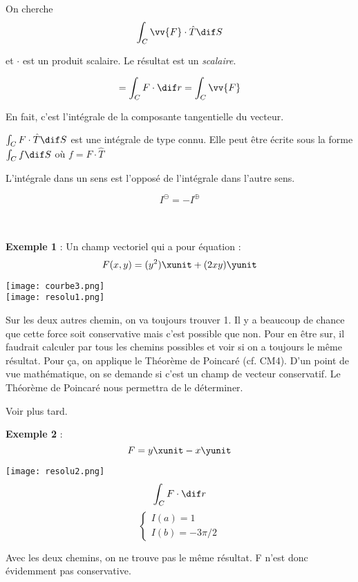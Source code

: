 On cherche
\[\int_C\vv{F}\cdot \hat T \dif S\]

et $\cdot$ est un produit scalaire. Le résultat est un \emph{scalaire}.

\[= \int_C F\cdot \dif r = \int_C \vv{F}\]

En fait, c'est l'intégrale de la composante tangentielle du vecteur.

$\int_C F\cdot \hat T \dif S$ est une intégrale de type connu. Elle peut être écrite sous la forme $\int_C f \dif S$ où $f=F \cdot \hat{T}$

L'intégrale dans un sens est l'opposé de l'intégrale dans l'autre sens.

\[I^{\ominus} = -I^{\oplus}\]



\\
\\
\textbf{Exemple 1} :
Un champ vectoriel qui a pour équation :
\[F(x,y)=(y^2)\xunit+(2xy)\yunit\]

\texttt{[image: courbe3.png]}\\
\texttt{[image: resolu1.png]}

Sur les deux autres chemin, on va toujours trouver 1. Il y a beaucoup de chance que cette force soit conservative mais c'est possible que non. Pour en être sur, il faudrait calculer par tous les chemins possibles et voir si on a toujours le même résultat. Pour ça, on applique le Théorème de Poincaré (cf. CM4). D'un point de vue mathématique, on se demande si c'est un champ de vecteur conservatif. Le Théorème de Poincaré nous permettra de le déterminer.

\begin{mytheo}
Voir plus tard.
\end{mytheo}
\textbf{Exemple 2 }: \[F=y\xunit-x\yunit\]

\texttt{[image: resolu2.png]}
\[\int_C F \cdot \dif r\]
\[
\left\{
\begin{array}{l}
I(a)=1\\
I(b)=-3\pi/2
\end{array}
\right.
\]

Avec les deux chemins, on ne trouve pas le même résultat. F n'est donc évidemment pas conservative.
